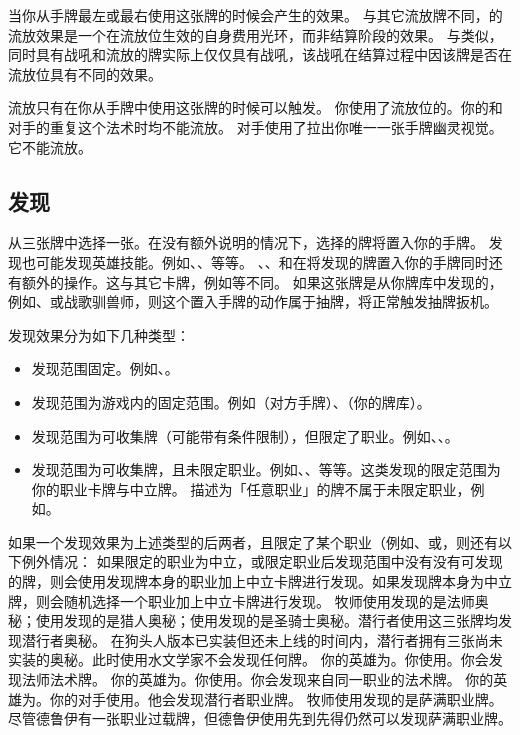 当你从手牌最左或最右使用这张牌的时候会产生的效果。
\notice 与其它流放牌不同，的流放效果是一个在流放位生效的自身费用光环，而非结算阶段的效果。
\notice 与类似，同时具有战吼和流放的牌实际上仅仅具有战吼，该战吼在结算过程中因该牌是否在流放位具有不同的效果。

流放只有在你从手牌中使用这张牌的时候可以触发。
\example 你使用了流放位的。你的和对手的重复这个法术时均不能流放。
\example 对手使用了拉出你唯一一张手牌幽灵视觉。它不能流放。

\subsection{发现}
\label{discover}

从三张牌中选择一张。在没有额外说明的情况下，选择的牌将置入你的手牌。
\notice 发现也可能发现英雄技能。例如、、等等。
\exception {}、、和在将发现的牌置入你的手牌同时还有额外的操作。这与其它卡牌，例如等不同。
\notice 如果这张牌是从你牌库中发现的，例如、或战歌驯兽师，则这个置入手牌的动作属于抽牌，将正常触发抽牌扳机。

发现效果分为如下几种类型：
\begin{itemize}
    \item 发现范围固定。例如、。
    \item 发现范围为游戏内的固定范围。例如（对方手牌）、（你的牌库）。
    \item 发现范围为可收集牌（可能带有条件限制），但限定了职业。例如、、。
    \item 发现范围为可收集牌，且未限定职业。例如、、等等。这类发现的限定范围为你的职业卡牌与中立牌。
        \notice 描述为「任意职业」的牌不属于未限定职业，例如。
\end{itemize}

如果一个发现效果为上述类型的后两者，且限定了某个职业（例如、或，则还有以下例外情况：
\notice 如果限定的职业为中立，或限定职业后发现范围中没有没有可发现的牌，则会使用发现牌本身的职业加上中立卡牌进行发现。如果发现牌本身为中立牌，则会随机选择一个职业加上中立卡牌进行发现。
\example 牧师使用发现的是法师奥秘；使用发现的是猎人奥秘；使用发现的是圣骑士奥秘。潜行者使用这三张牌均发现潜行者奥秘。
\history {} 在狗头人版本已实装但还未上线的时间内，潜行者拥有三张尚未实装的奥秘。此时使用水文学家不会发现任何牌。
\example 你的英雄为。你使用。你会发现法师法术牌。
\example 你的英雄为。你使用。你会发现来自同一职业的法术牌。
\example 你的英雄为。你的对手使用。他会发现潜行者职业牌。
\example 牧师使用发现的是萨满职业牌。
\exception 尽管德鲁伊有一张职业过载牌，但德鲁伊使用先到先得仍然可以发现萨满职业牌。


